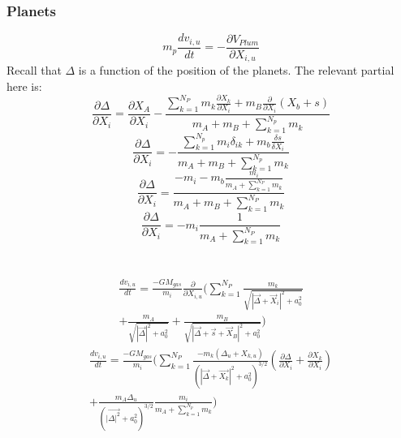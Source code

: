 \documentclass[manuscript]{aastex631}
\begin{document}
\subsubsection{Planets}
\begin{equation}
    m_p\frac{dv_{i,u}}{dt} = -\frac{\partial V_{Plum}}{\partial X_{i,u}}
\end{equation}
Recall that $\Delta$ is a function of the position of the planets. The relevant partial here is:
\begin{equation}
\frac{\partial \Delta}{\partial X_i} = \frac{\partial X_A}{\partial X_i} - 
\frac{\sum_{k=1}^{N_P}m_k\frac{\partial X_k}{\partial X_i}+m_B\frac{\partial}{\partial X_i}(X_b+s)}{m_A+m_B+\sum_{k=1}^{N_p}m_k}
\end{equation}
\begin{equation}
   \frac{\partial \Delta}{\partial X_i} = 
   -\frac{\sum_{k=1}^{N_p}m_i\delta_{ik}+m_b\frac{\delta s}{\delta X_i}}{m_A+m_B+\sum_{k=1}^{N_p}m_k} 
\end{equation}
\begin{equation}
\frac{\partial \Delta}{\partial X_i} = 
\frac{-m_i-m_b\frac{m_i}{m_A+\sum_{k=1}^{N_P}m_k}}{m_A+m_B +\sum_{k=1}^{N_P}m_k}
\end{equation}
\begin{equation}
    \frac{\partial \Delta}{\partial X_i} = -m_i\frac{1}{m_A+\sum_{k=1}^{N_P}m_k}
\end{equation}
\\ \\
\begin{equation}
\begin{split}
    \frac{dv_{i,u}}{dt} = 
    \frac{-GM_{gas}}{m_i}\frac{\partial}{\partial X_{i,u}}\biggl(\sum_{k=1}^{N_P}\frac{m_k}{\sqrt{|\vec{\Delta}+\vec{X}_i|^2+a_0^2}}\\
    +\frac{m_A}{\sqrt{|\vec{\Delta}|^2+a_0^2}}+\frac{m_B}{\sqrt{|\vec{\Delta}+\vec{s}+\vec{X}_B|^2+a^2_0}} \biggr )
\end{split}
\end{equation}
\begin{equation}
    \begin{split}
    \frac{dv_{i,u}}{dt} = 
    \frac{-GM_{gas}}{m_i}\biggl(\sum_{k=1}^{N_P}\frac{-m_k(\Delta_u+X_{k,u})}{(|\vec{\Delta}+\vec{X_k}|^2+a_0^2)^{3/2}}(\frac{\partial \Delta}{\partial X_i}+
    \frac{\partial X_k}{\partial X_i})\\+\frac{m_A\Delta_u}{(|\vec{\Delta|^2}+a_0^2)^{3/2}}\frac{m_i}{m_A+\sum_{k=1}^{N_p}m_k} \biggr)    
    \end{split}
\end{equation}
\end{document}
